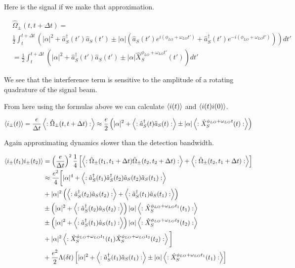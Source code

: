 \documentclass[12pt]{article}
\begin{document}
Here is the signal if we make that approximation.

\begin{align}
&\hat{\Omega}_{\pm}(t,t+\Delta t) = \\
&\frac{1}{2}\int_t^{t+\Delta t} \left( |\alpha|^2 + \hat{a}^{\dag}_S(t')\hat{a}_{S}(t') \pm |\alpha|\left( \hat{a}_S(t') e^{i(\phi_{LO}+\omega_{LO} t')} + \hat{a}^{\dag}_{S}(t')e^{-i(\phi_{LO}+\omega_{LO} t')}\right)\right) dt' \\
&= \frac{1}{2}\int_t^{t+\Delta t} \left( |\alpha|^2 + \hat{a}^{\dag}_S(t')\hat{a}_{S}(t') \pm |\alpha|\hat{X}_S^{\phi_{LO}+\omega_{LO} t'}(t') \right) dt'
\end{align}

We see that the interference term is sensitive to the amplitude of a rotating quadrature of the signal beam.

From here using the formulas above we can calculate $\braket{i(t)}$ and $\braket{i(t)i(0)}$.

\begin{align}
\braket{i_{\pm}(t)} = \frac{e}{\Delta t} \left<:\hat{\Omega}_{\pm}(t,t+\Delta t):\right>
\approx \frac{e}{2}\left(|\alpha|^2 + \left<:\hat{a}^{\dag}_S(t) \hat{a}_S(t):\right> \pm |\alpha| \left<:\hat{X}_S^{\phi_{LO}+\omega_{LO}t}(t):\right>\right)
\end{align}

Again approximating dynamics slower than the detection bandwidth.

\begin{align}
\braket{i_{\pm}(t_1)i_{\pm}(t_2)} &= \left(\frac{e}{\Delta t}\right)^2\frac{1}{4} \left[ \left<:\hat{\Omega}_{\pm}(t_1,t_1+\Delta t)\hat{\Omega}_{\pm}(t_2,t_2+\Delta t):\right> + \left<:\hat{\Omega}_{\pm}(t_2,t_1+\Delta t):\right>\right]\\
&\approx \frac{e^2}{4}\bigg[|\alpha|^4 + \left<:\hat{a}^{\dag}_{S}(t_1)\hat{a}^{\dag}_{S}(t_2)\hat{a}_{S}(t_2)\hat{a}_S(t_1):\right> \\
&+ |\alpha|^2\left( \left<:\hat{a}^{\dag}_{S}(t_2)\hat{a}_{S}(t_2):\right> + \left<:\hat{a}^{\dag}_{S}(t_1)\hat{a}_{S}(t_1):\right>  \right)\\
&\pm\left(|\alpha|^2+\left<:\hat{a}^{\dag}_{S}(t_2)\hat{a}_{S}(t_2):\right>\right)|\alpha|\left<:\hat{X}_{S}^{\phi_{LO}+\omega_{LO}t_1}(t_1):\right>\\
&\pm\left(|\alpha|^2+\left<:\hat{a}^{\dag}_{S}(t_1)\hat{a}_{S}(t_1):\right>\right)|\alpha|\left<:\hat{X}_{S}^{\phi_{LO}+\omega_{LO}t_2}(t_2):\right>\\
&+|\alpha|^2\left<:\hat{X}_S^{\phi_{LO}+\omega_{LO}t_1}(t_1)\hat{X}_S^{\phi_{LO}+\omega_{LO}t_2}(t_2):\right>\bigg]\\
&+ \frac{e^2}{2}\Lambda(\delta t)\left[|\alpha|^2 + \left<:\hat{a}^{\dag}_S(t_1) \hat{a}_S(t_1):\right> \pm |\alpha| \left<:\hat{X}_S^{\phi_{LO}+\omega_{LO}t_1}(t_1):\right>\right]
\end{align}
\end{document}
